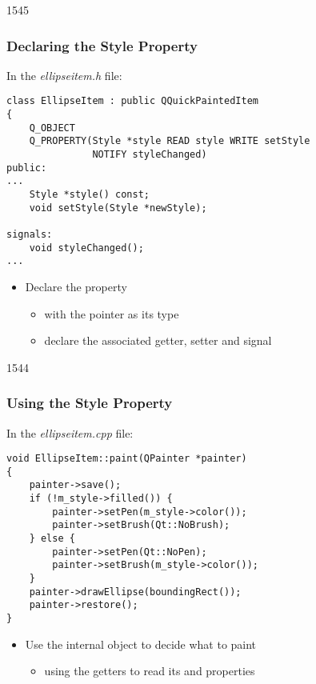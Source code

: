 \begin{slide}[fragile]{1545}\frametitle{Declaring the Style Property}

In the \textit{ellipseitem.h} file:

\vspace*{0.25em}
\begin{lstlisting}
class EllipseItem : public QQuickPaintedItem
{
    Q_OBJECT
    Q_PROPERTY(Style *style READ style WRITE setStyle
               NOTIFY styleChanged)
public:
...
    Style *style() const;
    void setStyle(Style *newStyle);

signals:
    void styleChanged();
...
\end{lstlisting}

\begin{itemize}
\item Declare the  property
  \begin{itemize}
  \item with the  pointer as its type
  \item declare the associated getter, setter and signal
  \end{itemize}
\end{itemize}

\end{slide}

\begin{slide}[fragile]{1544}\frametitle{Using the Style Property}

In the \textit{ellipseitem.cpp} file:

\vspace*{0.25em}
\begin{lstlisting}
void EllipseItem::paint(QPainter *painter)
{
    painter->save();
    if (!m_style->filled()) {
        painter->setPen(m_style->color());
        painter->setBrush(Qt::NoBrush);
    } else {
        painter->setPen(Qt::NoPen);
        painter->setBrush(m_style->color());
    }
    painter->drawEllipse(boundingRect());
    painter->restore();
}
\end{lstlisting}

\begin{itemize}
\item Use the internal  object to decide what to paint
  \begin{itemize}
  \item using the getters to read its  and 
        properties
  \end{itemize}
\end{itemize}

\end{slide}

